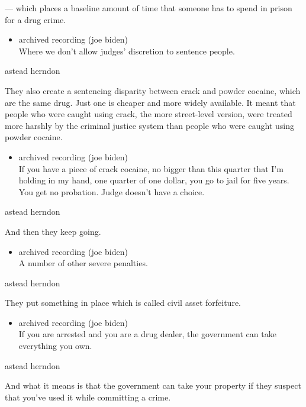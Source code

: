 --- which places a baseline amount of time that someone has to spend in
prison for a drug crime.

\begin{itemize}
\tightlist
\item
  archived recording (joe biden)\\
  Where we don't allow judges' discretion to sentence people.
\end{itemize}

astead herndon

They also create a sentencing disparity between crack and powder
cocaine, which are the same drug. Just one is cheaper and more widely
available. It meant that people who were caught using crack, the more
street-level version, were treated more harshly by the criminal justice
system than people who were caught using powder cocaine.

\begin{itemize}
\tightlist
\item
  archived recording (joe biden)\\
  If you have a piece of crack cocaine, no bigger than this quarter that
  I'm holding in my hand, one quarter of one dollar, you go to jail for
  five years. You get no probation. Judge doesn't have a choice.
\end{itemize}

astead herndon

And then they keep going.

\begin{itemize}
\tightlist
\item
  archived recording (joe biden)\\
  A number of other severe penalties.
\end{itemize}

astead herndon

They put something in place which is called civil asset forfeiture.

\begin{itemize}
\tightlist
\item
  archived recording (joe biden)\\
  If you are arrested and you are a drug dealer, the government can take
  everything you own.
\end{itemize}

astead herndon

And what it means is that the government can take your property if they
suspect that you've used it while committing a crime.

